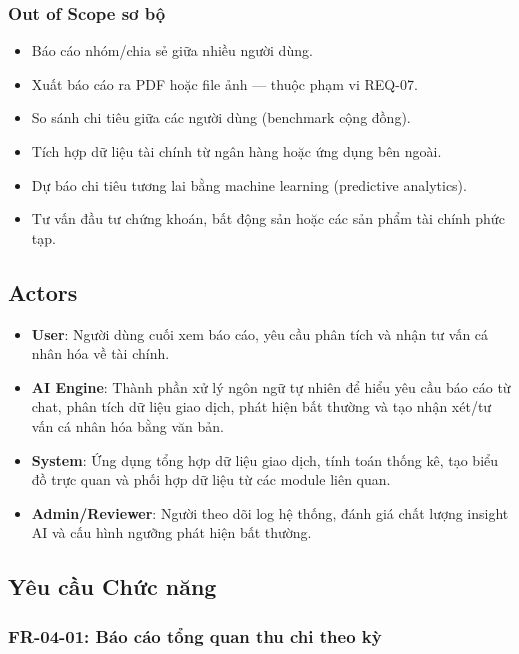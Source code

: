 \subsubsection{Out of Scope sơ bộ}

\begin{itemize}
\item Báo cáo nhóm/chia sẻ giữa nhiều người dùng.
\item Xuất báo cáo ra PDF hoặc file ảnh — thuộc phạm vi REQ-07.
\item So sánh chi tiêu giữa các người dùng (benchmark cộng đồng).
\item Tích hợp dữ liệu tài chính từ ngân hàng hoặc ứng dụng bên ngoài.
\item Dự báo chi tiêu tương lai bằng machine learning (predictive analytics).
\item Tư vấn đầu tư chứng khoán, bất động sản hoặc các sản phẩm tài chính phức tạp.
\end{itemize}
\subsection{Actors}

\begin{itemize}
\item \textbf{User}: Người dùng cuối xem báo cáo, yêu cầu phân tích và nhận tư vấn cá nhân hóa về tài chính.
\item \textbf{AI Engine}: Thành phần xử lý ngôn ngữ tự nhiên để hiểu yêu cầu báo cáo từ chat, phân tích dữ liệu giao dịch, phát hiện bất thường và tạo nhận xét/tư vấn cá nhân hóa bằng văn bản.
\item \textbf{System}: Ứng dụng tổng hợp dữ liệu giao dịch, tính toán thống kê, tạo biểu đồ trực quan và phối hợp dữ liệu từ các module liên quan.
\item \textbf{Admin/Reviewer}: Người theo dõi log hệ thống, đánh giá chất lượng insight AI và cấu hình ngưỡng phát hiện bất thường.
\end{itemize}
\subsection{Yêu cầu Chức năng}



\subsubsection{FR-04-01: Báo cáo tổng quan thu chi theo kỳ}

